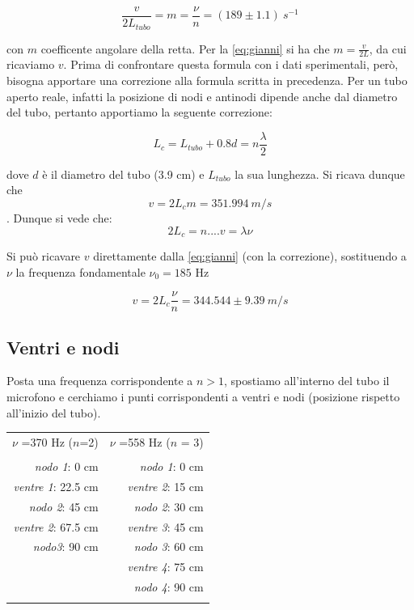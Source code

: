 \documentclass[a4paper,10pt]{report}
\begin{document}
$$ \frac{v}{2L_{tubo}} = m = \frac{\nu}{n} = (189 \pm 1.1)\ s^{-1}$$

con $m$  coefficente angolare della retta. Per la \ref{eq:gianni} si ha che $\displaystyle{m=\frac{v}{2L}}$, da cui ricaviamo $v$. Prima di confrontare questa formula con i dati sperimentali, però, bisogna apportare una correzione alla formula scritta in precedenza. Per un tubo aperto reale, infatti la posizione di nodi e antinodi dipende anche dal diametro del tubo, pertanto apportiamo la seguente correzione:

$$ L_c = L_{tubo}+0.8d = n\frac{\lambda}{2} $$

dove $d$ è il diametro del tubo (3.9 cm) e $L_{tubo}$ la sua lunghezza. 
Si ricava dunque che $$v=2L_cm=351.994\ m/s$$.
Dunque si vede che:
$$ 2L_c= n.... v = \lambda\nu$$

Si può ricavare $v$ direttamente dalla \ref{eq:gianni} (con la correzione), sostituendo a $\nu$ la frequenza fondamentale $\nu_0 = 185$ Hz

$$ v = 2L_c\frac{\nu}{n} = 344.544\pm9.39\ m/s$$ 
   
 
\subsection{Ventri e nodi}

Posta una frequenza corrispondente a $n>1$, spostiamo all'interno del tubo il microfono e cerchiamo i punti corrispondenti a ventri e nodi (posizione rispetto all'inizio del tubo).\\

\begin{center}
\begin{tabular}{r  r}

$\nu$ =370 Hz ($n$=2) & $\nu$ =558 Hz ($n$ = 3)\\
\\
\textit{nodo 1}: 0 cm & \textit{nodo 1}:  0 cm\\
\textit{ventre 1}: 22.5 cm & \textit{ventre 2}: 15 cm\\
\textit{nodo 2}: 45 cm &\textit{nodo 2}: 30 cm\\
\textit{ventre 2}: 67.5 cm&\textit{ventre 3}: 45 cm\\
\textit{nodo3}: 90 cm & \textit{nodo 3}: 60 cm\\
&\textit{ventre 4}: 75 cm\\
&\textit{nodo 4}: 90 cm\\
\\

\end{tabular}
\end{center}
\end{document}
